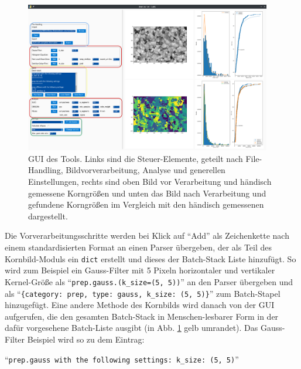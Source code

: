 \documentclass[
  12pt,
]{book}
\begin{document}
\begin{figure}

{\centering \includegraphics[width=0.96\textwidth]{../imgs/gui} 

}

\caption[GUI des Tools.]{GUI des Tools. Links sind die Steuer-Elemente, geteilt nach File-Handling, Bildvorverarbeitung, Analyse und generellen Einstellungen, rechts sind oben Bild vor Verarbeitung und händisch gemessene Korngrößen und unten das Bild nach Verarbeitung und gefundene Korngrößen im Vergleich mit den händisch gemessenen dargestellt.}\label{fig:grainGUI}
\end{figure}

Die Vorverarbeitungsschritte werden bei Klick auf ``Add'' als Zeichenkette nach einem standardisierten Format an einen Parser übergeben, der als Teil des Kornbild-Moduls ein \texttt{dict} erstellt und dieses der Batch-Stack Liste hinzufügt. So wird zum Beispiel ein Gauss-Filter mit 5 Pixeln horizontaler und vertikaler Kernel-Größe als ``\texttt{prep.gauss.(k\_size=(5,\ 5))}'' an den Parser übergeben und als ``\texttt{\{\textquotesingle{}category\textquotesingle{}:\ \textquotesingle{}prep\textquotesingle{},\ \textquotesingle{}type\textquotesingle{}:\ \textquotesingle{}gauss\textquotesingle{},\ \textquotesingle{}k\_size\textquotesingle{}:\ (5,\ 5)\}}'' zum Batch-Stapel hinzugefügt. Eine andere Methode des Kornbilds wird danach von der GUI aufgerufen, die den gesamten Batch-Stack in Menschen-lesbarer Form in der dafür vorgesehene Batch-Liste ausgibt (in Abb. \ref{fig:grainGUI} gelb umrandet). Das Gauss-Filter Beispiel wird so zu dem Eintrag:

``\texttt{prep.gauss\ with\ the\ following\ settings:\ k\_size:\ (5,\ 5)}''
\end{document}
